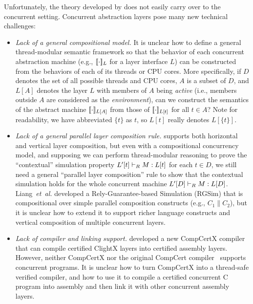 {Unfortunately, the theory developed by \citet{dscal15} does not easily
carry over to the concurrent setting. Concurrent abstraction layers
pose many new technical challenges:
\begin{itemize} \itemsep 0pt
\item 
  {\em Lack of a general compositional model.} It is unclear how to
  define a general thread-modular semantic framework so that the
  behavior of each concurrent abstraction machine (e.g.,
  $[\![\cdot]\!]_{L}$ for a layer interface $L$) can be constructed from the
  behaviors of each of its threads or CPU cores. More specifically, if
  $D$ denotes the set of all possible threads and CPU cores, $A$ is a
  subset of $D$, and $L[A]$ denotes the layer $L$ with members of $A$
  being {\em active} (i.e., members outside $A$ are considered as the
  {\em environment}), can we construct the semantics of the abstract
  machine $[\![\cdot]\!]_{L[A]}$ from those of $[\![\cdot]\!]_{L[t]}$
  for all $t\in{}A$? Note for readability, we have abbreviated
  $\{t\}$ as $t$, so $L[t]$ really denotes $L[\{t\}]$.
\item {\em Lack of a general parallel layer composition rule.}
  \citet{dscal15} supports both horizontal and vertical layer
  composition, but even with a compositional concurrency model, and
  supposing we can perform thread-modular reasoning to prove the
  ``contextual'' simulation property $L'[t] \vdash_{R} M : L[t]$ for
  each $t\in{}D$, we still need a general ``parallel layer composition''
  rule to show that the contextual simulation holds for the whole
  concurrent machine $L'[D] \vdash_{R} M : L[D]$.
  Liang~{\em{}et~al.}\cite{RGSim,Liang14lics,lili16} developed a
  Rely-Guarantee-based Simulation (RGSim) that is compositional over
  simple parallel composition constructs (e.g., $C_1 \| C_2$), but
  it is unclear how to extend it to support richer language constructs
  and vertical composition of multiple concurrent layers.
\item {\em Lack of compiler and linking support.} \citet{dscal15}
  developed a new CompCertX compiler that can compile certified
  ClightX layers into certified assembly layers. However, neither
  CompCertX nor the original CompCert compiler~\cite{leroy08} supports
  concurrent programs. It is unclear how to turn CompCertX into a
  thread-safe verified compiler, and how to use it to compile a
  certified concurrent C program into assembly and then link it with
  other concurrent assembly layers.
\end{itemize}

}
